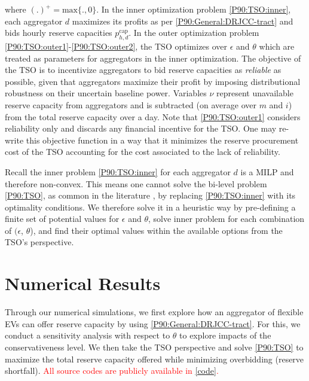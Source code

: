 \documentclass[conference]{IEEEtran}
\newcommand{\red}[1]{\textcolor{red}{#1}}
\begin{document}
where $(.)^{+}\!=\!\text{max} \{.,0\}.$
In the inner optimization problem \eqref{P90:TSO:inner}, each aggregator $d$ maximizes its profits as per \eqref{P90:General:DRJCC-tract} and bids hourly reserve capacities $p_{h,d}^{\text{cap}}$. In the outer optimization problem \eqref{P90:TSO:outer1}-\eqref{P90:TSO:outer2}, the \ac{TSO} optimizes over $\epsilon$ and $\theta$ which are treated as parameters for aggregators in the inner optimization. The objective of the \ac{TSO} is to incentivize aggregators to bid reserve capacities as \textit{reliable} as possible, given that aggregators maximize their profit by imposing distributional robustness on their uncertain baseline power. Variables $\nu$ represent unavailable reserve capacity from aggregators and is subtracted (on average over $m$ and $i$) from the total reserve capacity over a day. Note that  \eqref{P90:TSO:outer1} considers reliability only and discards any financial incentive for the TSO. One may re-write this objective function in a way that it minimizes the reserve procurement cost of the TSO accounting for the cost associated to the lack of reliability. 

Recall the inner problem \eqref{P90:TSO:inner} for each aggregator $d$ is a MILP and therefore non-convex. This means one cannot solve the bi-level problem \eqref{P90:TSO}, as common in the literature \cite{pozo}, by replacing \eqref{P90:TSO:inner} with its optimality conditions. We therefore solve it in a heuristic way by pre-defining a finite set of potential values for $\epsilon$ and $\theta$, solve inner problem for each combination of $(\epsilon$, $\theta$), and find their optimal values within the available  options from the TSO's perspective. 

\vspace{2mm}
\section{Numerical Results}
\vspace{-1mm}
Through our numerical simulations, we first explore 
how an aggregator of flexible \acp{EV} can offer reserve capacity by using \eqref{P90:General:DRJCC-tract}. For this, we conduct a sensitivity analysis with respect to $\theta$ to explore impacts of the conservativeness level. We then take the \ac{TSO} perspective and solve \eqref{P90:TSO} to  maximize the total reserve capacity offered while minimizing overbidding (reserve shortfall).  \red{All source codes are publicly available in \ref{code}.}
\end{document}
